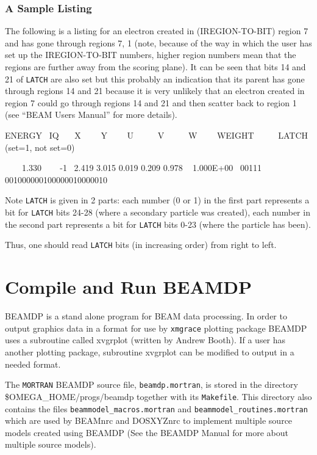 \documentclass[12pt,twoside]{article}
\begin{document}
\subsubsection{ A Sample Listing}
The following is a listing for an electron created in (IREGION-TO-BIT)
region 7 and has gone through regions 7, 1 (note, because of the way in
which the user has set up the IREGION-TO-BIT numbers, higher region numbers
mean that the regions are further away from the scoring plane). It can be
seen that bits 14 and 21 of \verb+LATCH+ are also set but this probably an
indication that its parent has gone through regions 14 and 21 because it
is very unlikely that an electron created in region 7 could go through
regions 14 and 21 and then scatter back to region 1 (see ``BEAM Users
Manual'' for more details).


\noindent
 ENERGY   ~IQ  ~~~X  ~~~~Y  ~~~~U      ~~~~~V      ~~~~~W     ~~~~WEIGHT       ~~~~~LATCH (set=1, not set=0)

\noindent
  ~~~~1.330 ~~~ -1   ~2.419   3.015  0.019  0.209  0.978  ~ 1.000E+00  ~00111 001000000100000010000010


\noindent
Note \verb+LATCH+ is given in 2 parts: each number (0 or 1) in the first part
represents a bit for \verb+LATCH+ bits 24-28 (where a secondary particle
was created), each number in the second part represents a bit for
\verb+LATCH+ bits 0-23 (where the particle has been).

Thus, one should read \verb+LATCH+ bits (in increasing order) from right
to left.


\section{Compile and Run BEAMDP}
BEAMDP is a stand alone program for BEAM data processing. In order to
output graphics data in a format for use by \verb+xmgrace+ plotting package
BEAMDP
uses a subroutine called xvgrplot (written by Andrew Booth). If a user has
another plotting package, subroutine xvgrplot can be modified to output in a
needed format.


The {\tt MORTRAN} BEAMDP source file, {\tt beamdp.mortran}, is stored in the
directory\\
\$OMEGA\_HOME/progs/beamdp together with its {\tt Makefile}.  This directory
also contains the files {\tt beammodel\_macros.mortran} and
{\tt beammodel\_routines.mortran} which are used by BEAMnrc\cite{Ro04a}
 and DOSXYZnrc\cite{WR04a} to implement multiple source models created
using BEAMDP (See the BEAMDP Manual\cite{MR04a} for more about multiple
source models).
\end{document}
